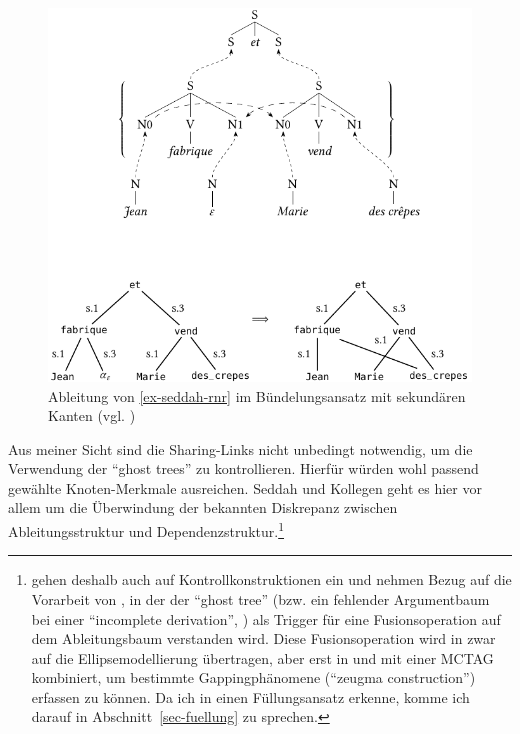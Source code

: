 \begin{figure}[t]
\centering
\includegraphics{graphics/abb813.pdf}
\caption{\label{fig-seddah-rnr-2}Ableitung von \ref{ex-seddah-rnr} im Bündelungsansatz mit sekundären Kanten (vgl. \citealt[Figure~2]{Seddah:etal:10})}
\end{figure}
   
Aus meiner Sicht sind die Sharing-Links nicht unbedingt notwendig, um die Verwendung der "`ghost trees"' zu kontrollieren. Hierfür würden wohl passend gewählte Knoten-Merkmale ausreichen. Seddah und Kollegen geht es hier vor allem um die Überwindung der bekannten Diskrepanz zwischen Ableitungsstruktur und Dependenzstruktur.\footnote{\cite{Seddah:etal:10} gehen deshalb auch auf Kontrollkonstruktionen ein und nehmen Bezug auf die Vorarbeit von \cite{Seddah:Gaiffe:05}, in der der "`ghost tree"' (bzw. ein fehlender Argumentbaum bei einer "`incomplete derivation"', \citealt[292]{Seddah:Gaiffe:05}) als Trigger für eine Fusionsoperation auf dem Ableitungsbaum verstanden wird. Diese Fusionsoperation wird in \cite{Seddah:Sagot:06} zwar auf die Ellipsemodellierung übertragen, aber erst in \cite{Seddah:08} und \cite{Seddah:etal:10} mit einer MCTAG kombiniert, um bestimmte Gappingphänomene ("`zeugma construction"') erfassen zu können. Da ich in \cite{Seddah:Sagot:06} einen Füllungsansatz erkenne, komme ich darauf in Abschnitt~\ref{sec-fuellung} zu sprechen.} 


